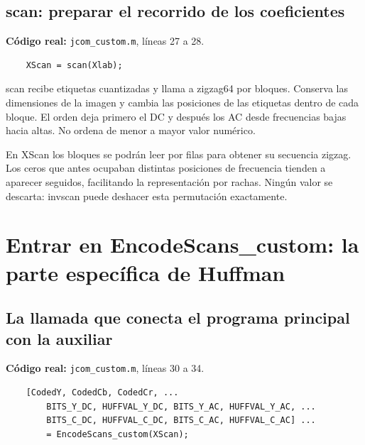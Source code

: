 \documentclass[11pt,a4paper,oneside]{report}
\begin{document}
\par\medskip\noindent\begin{minipage}{\linewidth}

\subsection{scan: preparar el recorrido de los coeficientes}

\textbf{Código real:} \texttt{jcom\_custom.m}, líneas 27 a 28.

\begin{lstlisting}[firstnumber=27]
    % PASO 5: recorrer los bloques en zigzag.
    XScan = scan(Xlab);
\end{lstlisting}

\end{minipage}\par


scan recibe etiquetas cuantizadas y llama a zigzag64 por bloques. Conserva
las dimensiones de la imagen y cambia las posiciones de las etiquetas dentro
de cada bloque. El orden deja primero el DC y después los AC desde frecuencias
bajas hacia altas. No ordena de menor a mayor valor numérico.

En XScan los bloques se podrán leer por filas para obtener su secuencia
zigzag. Los ceros que antes ocupaban distintas posiciones de frecuencia
tienden a aparecer seguidos, facilitando la representación por rachas.
Ningún valor se descarta: invscan puede deshacer esta permutación exactamente.


\section{Entrar en EncodeScans\_custom: la parte específica de Huffman}

\par\medskip\noindent\begin{minipage}{\linewidth}

\subsection{La llamada que conecta el programa principal con la auxiliar}

\textbf{Código real:} \texttt{jcom\_custom.m}, líneas 30 a 34.

\begin{lstlisting}[firstnumber=30]
    % PASO 6: construir las tablas a medida y codificar.
    [CodedY, CodedCb, CodedCr, ...
        BITS_Y_DC, HUFFVAL_Y_DC, BITS_Y_AC, HUFFVAL_Y_AC, ...
        BITS_C_DC, HUFFVAL_C_DC, BITS_C_AC, HUFFVAL_C_AC] ...
        = EncodeScans_custom(XScan);
\end{lstlisting}

\end{minipage}\par
\end{document}
